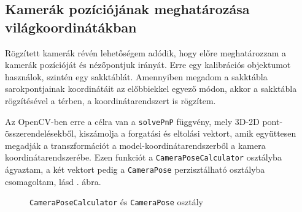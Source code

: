\subsection{Kamerák pozíciójának meghatározása világkoordinátákban}


Rögzített kamerák révén lehetőségem adódik, hogy előre meghatározzam a kamerák pozícióját és nézőpontjuk irányát. Erre egy kalibrációs objektumot használok, szintén egy sakktáblát. Amennyiben megadom a sakktábla sarokpontjainak koordinátáit az előbbiekkel egyező módon, akkor a sakktábla rögzítésével a térben, a koordinátarendszert is rögzítem. 

Az OpenCV-ben erre a célra van a \texttt{solvePnP} függvény, mely 3D-2D pont-összerendelésekből, kiszámolja a forgatási és eltolási vektort, amik együttesen megadják a transzformációt a model-koordinátarendszerből a kamera koordinátarendszerébe. Ezen funkciót a \texttt{CameraPoseCalculator} osztályba ágyaztam, a két vektort pedig a \texttt{CameraPose} perzisztálható osztályba csomagoltam, lásd . ábra.

\begin{figure}[tbh]
\centering


\caption{\texttt{CameraPoseCalculator} és \texttt{CameraPose} osztály \label{fig:cd:pose}}
\end{figure}


